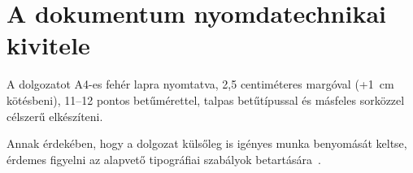 \section{A dokumentum nyomdatechnikai kivitele}
A dolgozatot A4-es fehér lapra nyomtatva, 2,5 centiméteres margóval (+1~cm kötésbeni), 11--12 pontos betűmérettel, talpas betűtípussal és másfeles sorközzel célszerű elkészíteni.

Annak érdekében, hogy a dolgozat külsőleg is igényes munka benyomását keltse, érdemes figyelni az alapvető tipográfiai szabályok betartására~\cite{Jeney}.
